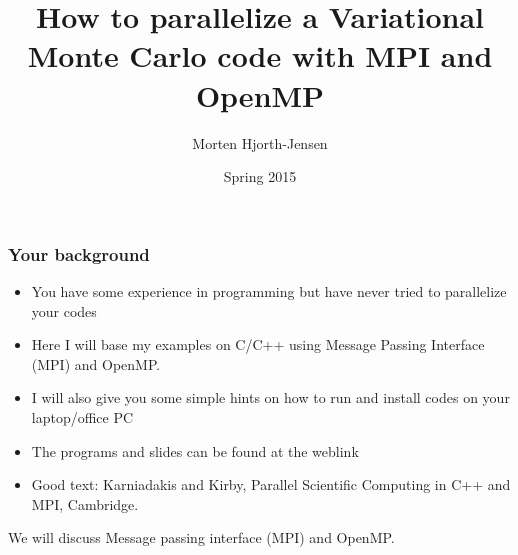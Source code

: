 \documentclass{beamer}
\begin{document}




\title{How to parallelize a Variational Monte Carlo code with MPI and OpenMP}


\author{Morten Hjorth-Jensen}

\date{Spring 2015
}

\begin{frame}
\titlepage
\end{frame}

\begin{frame}
\frametitle{Your background}

\begin{block}{}
\begin{itemize}
\item You have some experience in programming but have never tried to parallelize your codes

\item Here I will base my examples on C/C++ using Message Passing Interface (MPI) and OpenMP. 

\item I will also give you some simple hints on how to run and install codes on your laptop/office PC

\item The programs and slides can be found at the weblink

\item Good text: Karniadakis and Kirby, Parallel Scientific Computing in C++ and MPI, Cambridge.
\end{itemize}

\noindent
We will discuss Message passing interface (MPI) and OpenMP.
\end{block}
\end{frame}
\end{document}
